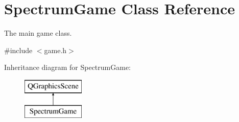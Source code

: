 \hypertarget{class_spectrum_game}{}\section{Spectrum\+Game Class Reference}
\label{class_spectrum_game}


The main game class.  




{\ttfamily \#include $<$game.\+h$>$}

Inheritance diagram for Spectrum\+Game\+:\begin{figure}[H]
\begin{center}
\leavevmode
\includegraphics[height=2.000000cm]{class_spectrum_game}
\end{center}
\end{figure}
